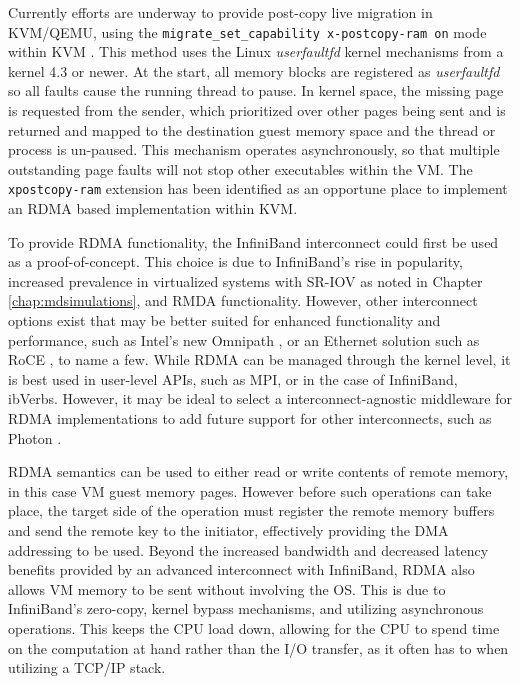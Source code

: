 Currently efforts are underway to provide post-copy live migration in KVM/QEMU, using the \verb!migrate_set_capability x-postcopy-ram on! mode within KVM \cite{www-kvm-postcopy}. This method uses the Linux \emph{userfaultfd} kernel mechanisms from a kernel 4.3 or newer. At the start, all memory blocks are registered as \emph{userfaultfd} so all faults cause the running thread to pause. In kernel space, the missing page is requested from the sender, which prioritized over other pages being sent and is returned and mapped to the destination guest memory space and the thread or process is un-paused. This mechanism operates asynchronously, so that multiple outstanding page faults will not stop other executables within the VM. The \verb!xpostcopy-ram! extension has been identified as an opportune place to implement an RDMA based implementation within KVM. 

To provide RDMA functionality, the InfiniBand interconnect could first be used as a proof-of-concept. This choice is due to InfiniBand's rise in popularity, increased prevalence in virtualized systems  with SR-IOV as noted in Chapter \ref{chap:mdsimulations}, and RMDA functionality. However, other interconnect options exist that may be better suited for enhanced functionality and performance, such as Intel's new Omnipath \cite{omnipath2015}, or an Ethernet solution such as RoCE \cite{beck2011roce}, to name a few.  While RDMA can be managed through the kernel level, it is best used in user-level APIs, such as MPI, or in the case of InfiniBand, ibVerbs. However, it may be ideal to select a interconnect-agnostic middleware for RDMA implementations to add future support for other interconnects, such as Photon \cite{kissel2016photon}.



RDMA semantics can be used to either read or write contents of remote memory, in this case VM guest memory pages. However before such operations can take place, the target side of the operation must register the remote memory buffers and send the remote key to the initiator, effectively providing the DMA addressing to be used. Beyond the increased bandwidth and decreased latency benefits provided by an advanced interconnect with InfiniBand, RDMA also allows VM memory to be sent without involving the OS. This is due to InfiniBand's zero-copy, kernel bypass mechanisms, and utilizing asynchronous operations. This keeps the CPU load down, allowing for the CPU to spend time on the computation at hand rather than the I/O transfer, as it often has to when utilizing a TCP/IP stack. 
 
